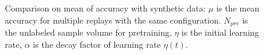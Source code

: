 \documentclass[3p,times,procedia]{elsarticle}
\begin{document}
\begin{figure}[h]
	\centering
	\hspace{-8mm}
	\hspace{-8mm}
	\caption{
		Comparison on mean of 
		accuracy with synthetic data:
		$\mu$ is the mean accuracy for
		multiple replays with the same
		configuration.
		$N_{pre}$ is the unlabeled sample 
		volume for pretraining, $\eta$
		is the initial learning rate,
		$\alpha$ is the decay factor of
		learning rate $\eta(t)$.
		}
	\label{fig:2}
\end{figure}
\end{document}
